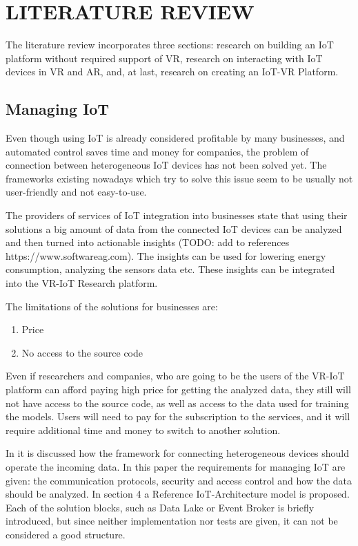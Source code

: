 
\chapter{LITERATURE REVIEW}


The literature review incorporates three sections: research on building an IoT platform without required support of VR, research on interacting with IoT devices in VR and AR, and, at last, research on creating an IoT-VR Platform.

\section{Managing IoT}

Even though using IoT is already considered profitable by many businesses, and automated control saves 
time and money for companies, the problem of connection between heterogeneous IoT devices has not been solved yet. The frameworks existing nowadays which try to solve this issue seem to be usually not user-friendly and not easy-to-use. 

The providers of services of IoT integration into businesses state that using their solutions a big 
amount of data from the connected IoT devices can be analyzed and then turned into actionable 
insights (TODO: add to references https://www.softwareag.com). The insights can be used for lowering energy consumption, analyzing the sensors data etc. These insights can be integrated into the VR-IoT Research platform.

The limitations of the solutions for businesses are:
\begin{enumerate}
    \item Price
    \item No access to the source code
\end{enumerate}

Even if researchers and companies, who are going to be the users of the VR-IoT platform can afford paying high price for getting the analyzed data, they still will not have access to the source code, as well as access to the data used for training the models. Users will need to pay for the subscription to the services, and it will require additional time and money to switch to another solution.

In \cite{k_mohapatra_solution_2016} it is discussed how the framework for connecting heterogeneous devices should operate the incoming data. In this paper the requirements for managing IoT are given: the communication protocols, security and access control and how the data should be analyzed. In section 4 a Reference IoT-Architecture model is proposed. Each of the solution blocks, such as Data Lake or Event Broker is briefly introduced, but since neither implementation nor tests are given, it can not be considered a good structure.

